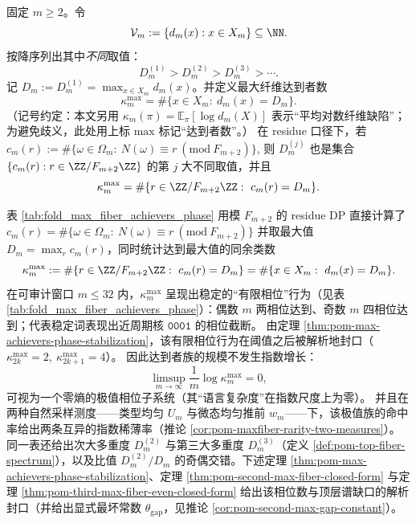 



\begin{definition}[顶层纤维谱与达到者数]\label{def:pom-top-fiber-spectrum}
固定 \(m\ge 2\)。令
\[
\mathcal{V}_m:=\{d_m(x):x\in X_m\}\subseteq \NN.
\]
按降序列出其中\emph{不同}取值：
\[
D_m^{(1)} > D_m^{(2)} > D_m^{(3)} > \cdots.
\]
记 \(D_m:=D_m^{(1)}=\max_{x\in X_m}d_m(x)\)。并定义最大纤维达到者数
\[
\kappa_m^{\mathrm{max}}
=\#\{x\in X_m:\ d_m(x)=D_m\}.
\]
（记号约定：本文另用 \(\kappa_m(\pi)=\mathbb{E}_\pi[\log d_m(X)]\) 表示“平均对数纤维缺陷”；为避免歧义，此处用上标 \(\mathrm{max}\) 标记“达到者数”。）
在 residue 口径下，若
\(
c_m(r):=\#\{\omega\in\Omega_m:\ N(\omega)\equiv r\ (\mathrm{mod}\ F_{m+2})\}
\),
则 \(D_m^{(j)}\) 也是集合 \(\{c_m(r):r\in\ZZ/F_{m+2}\ZZ\}\) 的第 \(j\) 大不同取值，并且
\[
\kappa_m^{\mathrm{max}}=\#\{r\in\ZZ/F_{m+2}\ZZ:\ c_m(r)=D_m\}.
\]
\end{definition}

\begin{remark}\label{rem:pom-max-fiber-achievers-phase}
表 \ref{tab:fold_max_fiber_achievers_phase} 用模 \(F_{m+2}\) 的 residue DP 直接计算了
\(
c_m(r)=\#\{\omega\in\Omega_m:\ N(\omega)\equiv r\ (\mathrm{mod}\ F_{m+2})\}
\)
并取最大值 \(D_m=\max_r c_m(r)\)，同时统计达到最大值的同余类数
\[
\kappa_m^{\mathrm{max}}:=\#\{r\in\ZZ/F_{m+2}\ZZ:\ c_m(r)=D_m\}
=\#\{x\in X_m:\ d_m(x)=D_m\}.
\]
在可审计窗口 \(m\le 32\) 内，\(\kappa_m^{\mathrm{max}}\) 呈现出稳定的“有限相位”行为（见表 \ref{tab:fold_max_fiber_achievers_phase}）：偶数 \(m\) 两相位达到、奇数 \(m\) 四相位达到；代表稳定词表现出近周期核 \(\texttt{0001}\) 的相位截断。
由定理 \ref{thm:pom-max-achievers-phase-stabilization}，该有限相位行为在阈值之后被解析地封口（\(\kappa_{2k}^{\mathrm{max}}=2,\ \kappa_{2k+1}^{\mathrm{max}}=4\)）。
因此达到者族的规模不发生指数增长：
\[
\limsup_{m\to\infty}\frac{1}{m}\log \kappa_m^{\mathrm{max}}=0,
\]
可视为一个零熵的极值相位子系统（其“语言复杂度”在指数尺度上为零）。
并且在两种自然采样测度——类型均匀 \(U_m\) 与微态均匀推前 \(w_m\)——下，该极值族的命中率给出两条互异的指数稀薄率（推论 \ref{cor:pom-maxfiber-rarity-two-measures}）。
同一表还给出次大多重度 \(D_m^{(2)}\) 与第三大多重度 \(D_m^{(3)}\)（定义 \ref{def:pom-top-fiber-spectrum}），以及比值 \(D_m^{(2)}/D_m\) 的奇偶交错。下述定理 \ref{thm:pom-max-achievers-phase-stabilization}、定理 \ref{thm:pom-second-max-fiber-closed-form} 与定理 \ref{thm:pom-third-max-fiber-even-closed-form} 给出该相位数与顶层谱缺口的解析封口（并给出显式最坏常数 \(\theta_{\mathrm{gap}}\)，见推论 \ref{cor:pom-second-max-gap-constant}）。
\end{remark}

